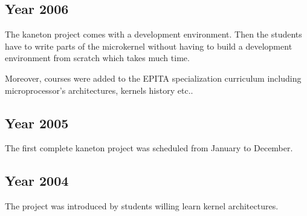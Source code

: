 %
%

\subsection{Year 2006}

The kaneton project comes with a development environment. Then the
students have to write parts of the microkernel without having to
build a development environment from scratch which takes much time.

Moreover, courses were added to the EPITA specialization curriculum
including microprocessor's architectures, kernels history etc..

%
%

\subsection{Year 2005}

The first complete kaneton project was scheduled from January to December.

%
%

\subsection{Year 2004}

The project was introduced by students willing learn kernel architectures.
